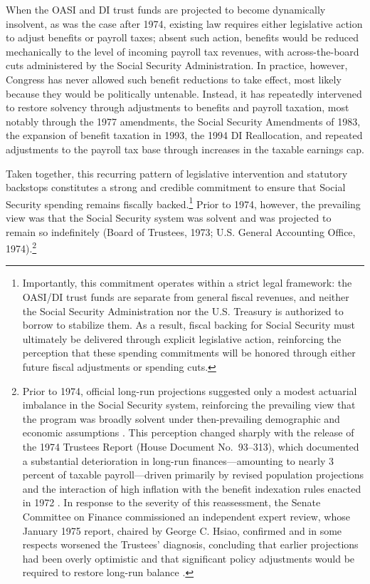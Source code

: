 \documentclass[12pt]{article}%
\theoremstyle{remark}
\begin{document}
When the OASI and DI trust funds are projected to become dynamically insolvent, as was the case after 1974, existing law requires either legislative action to adjust benefits or payroll taxes; absent such action, benefits would be reduced mechanically to the level of incoming payroll tax revenues, with across-the-board cuts administered by the Social Security Administration. In practice, however, Congress has never allowed such benefit reductions to take effect, most likely because they would be politically untenable. Instead, it has repeatedly intervened to restore solvency through adjustments to benefits and payroll taxation, most notably through the 1977 amendments, the Social Security Amendments of 1983, the expansion of benefit taxation in 1993, the 1994 DI Reallocation, and repeated adjustments to the payroll tax base through increases in the taxable earnings cap.

Taken together, this recurring pattern of legislative intervention and statutory backstops constitutes a strong and credible commitment to ensure that Social Security spending remains fiscally backed.\footnote{Importantly, this commitment operates within a strict legal framework: the OASI/DI trust funds are separate from general fiscal revenues, and neither the Social Security Administration nor the U.S. Treasury is authorized to borrow to stabilize them. As a result, fiscal backing for Social Security must ultimately be delivered through explicit legislative action, reinforcing the perception that these spending commitments will be honored through either future fiscal adjustments or spending cuts.}
Prior to 1974, however, the prevailing view was that the Social Security system was solvent and was projected to remain so indefinitely (Board of Trustees, 1973; U.S. General Accounting Office, 1974).\footnote{Prior to 1974, official long-run projections suggested only a modest actuarial imbalance in the Social Security system, reinforcing the prevailing view that the program was broadly solvent under then-prevailing demographic and economic assumptions \citep{SSA1973Trustees,GAO1974SSFinancing}. This perception changed sharply with the release of the 1974 Trustees Report (House Document No.~93--313), which documented a substantial deterioration in long-run finances---amounting to nearly 3 percent of taxable payroll---driven primarily by revised population projections and the interaction of high inflation with the benefit indexation rules enacted in 1972 \citep{SSA1974Trustees}. In response to the severity of this reassessment, the Senate Committee on Finance commissioned an independent expert review, whose January 1975 report, chaired by George C. Hsiao, confirmed and in some respects worsened the Trustees' diagnosis, concluding that earlier projections had been overly optimistic and that significant policy adjustments would be required to restore long-run balance \citep{Hsiao1975Report}.}
\end{document}
